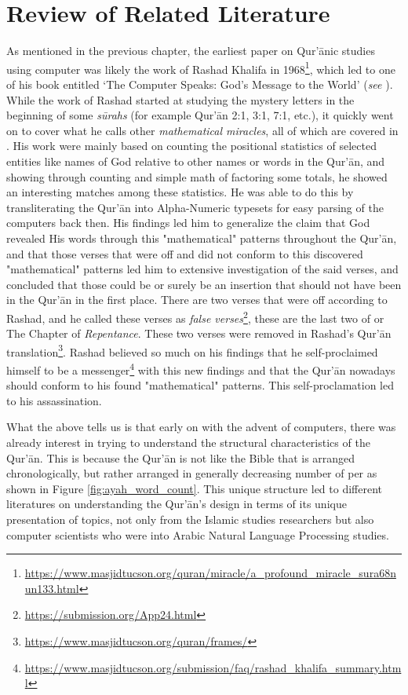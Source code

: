 \chapter{Review of Related Literature}\label{ch:rrl}

As mentioned in the previous chapter, the earliest paper on Qur'\=anic studies using computer was likely the work of Rashad Khalifa in 1968\footnote{\url{https://www.masjidtucson.org/quran/miracle/a_profound_miracle_sura68nun133.html}}, which led to one of his book entitled `The Computer Speaks: God's Message to the World' (\textit{see} ). While the work of Rashad started at studying the mystery letters in the beginning of some \textit{s\=urahs}  (for example Qur'\=an 2:1, 3:1, 7:1, etc.), it quickly went on to cover what he calls other \textit{mathematical miracles}, all of which are covered in . His work were mainly based on counting the positional statistics of selected entities like names of God relative to other names or words in the Qur'\=an, and showing through counting and simple math of factoring some totals, he showed an interesting matches among these statistics. He was able to do this by transliterating the Qur'\=an into Alpha-Numeric typesets for easy parsing of the computers back then. His findings led him to generalize the claim that God revealed His words through this "mathematical" patterns throughout the Qur'\=an, and that those verses that were off and did not conform to this discovered "mathematical" patterns led him to extensive investigation of the said verses, and concluded that those could be or surely be an insertion that should not have been in the Qur'\=an in the first place. There are two verses that were off according to Rashad, and he called these verses as \textit{false verses}\footnote{\url{https://submission.org/App24.html}}, these are the last two   of   or The Chapter of \textit{Repentance}. These two verses were removed in Rashad's Qur'\=an translation\footnote{\url{https://www.masjidtucson.org/quran/frames/}}. Rashad believed so much on his findings that he self-proclaimed himself to be a messenger\footnote{\url{https://www.masjidtucson.org/submission/faq/rashad_khalifa_summary.html}} with this new findings and that the Qur'\=an nowadays should conform to his found "mathematical" patterns. This self-proclamation led to his assassination.

What the above tells us is that early on with the advent of computers, there was already interest in trying to understand the structural characteristics of the Qur'\=an. This is because the Qur'\=an is not like the Bible that is arranged chronologically, but rather arranged in generally decreasing number of   per   as shown in Figure \ref{fig:ayah_word_count}. This unique structure led to different literatures on understanding the Qur'\=an's design in terms of its unique presentation of topics, not only from the Islamic studies researchers but also computer scientists who were into Arabic Natural Language Processing studies. 

